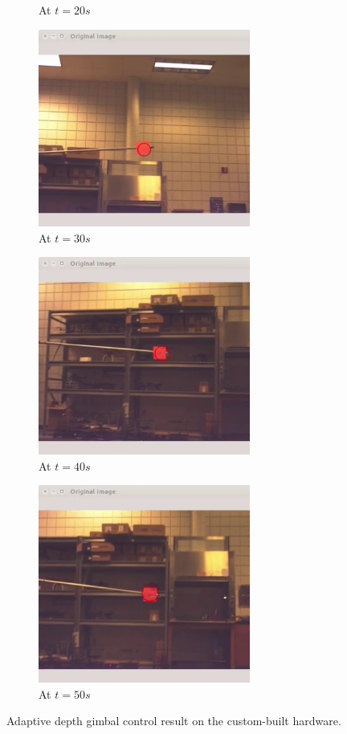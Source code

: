\begin{figure}[htbp]
\begin{subfigure}{0.5\textwidth}
		\caption{At $t=20s$}
	\end{subfigure}%
	\begin{subfigure}{0.5\textwidth}
		\centering
		\includegraphics[height=6.5cm]{images/chapter2/gimbal_hardware_4.png}
		\caption{At $t=30s$}
	\end{subfigure}	
	\begin{subfigure}{0.5\textwidth}
		\centering
		\includegraphics[height=6.5cm]{images/chapter2/gimbal_hardware_5.png}
		\caption{At $t=40s$}
	\end{subfigure}%
	\begin{subfigure}{0.5\textwidth}
		\centering
		\includegraphics[height=6.5cm]{images/chapter2/gimbal_hardware_6.png}
		\caption{At $t=50s$}
	\end{subfigure}	
	\caption{Adaptive depth gimbal control result on the custom-built hardware.}
	\label{gimbal_hardware_result}
\end{figure}

